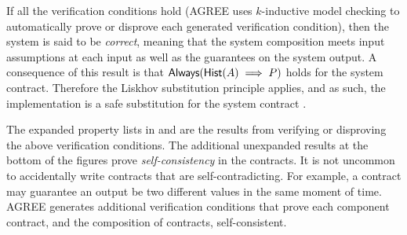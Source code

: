 If all the verification conditions hold (AGREE uses $k$-inductive
model checking to automatically prove or disprove each generated
verification condition), then the system is said to be \emph{correct},
meaning that the system composition meets input assumptions at each
input as well as the guarantees on the system output. A consequence of
this result is that $\mathsf{Always}(\mathsf{Hist}(A) \implies
P)$ holds for the system contract.
Therefore the Liskhov substitution principle applies, and as such, the implementation is a safe substitution for the system contract \cite{10.1145/62139.62141}.

The expanded property lists in  and
 are the results from verifying or
disproving the above verification conditions.  The additional
unexpanded results at the bottom of the figures prove
\emph{self-consistency} in the contracts.  It is not uncommon to
accidentally write contracts that are self-contradicting.  For
example, a contract may guarantee an output be two different values in
the same moment of time.  AGREE generates additional verification
conditions that prove each component contract, and the composition of
contracts, self-consistent.
